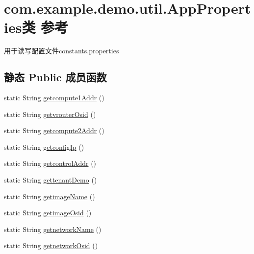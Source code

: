 \hypertarget{classcom_1_1example_1_1demo_1_1util_1_1_app_properties}{}\section{com.\+example.\+demo.\+util.\+App\+Properties类 参考}
\label{classcom_1_1example_1_1demo_1_1util_1_1_app_properties}


用于读写配置文件constants.\+properties  


\subsection*{静态 Public 成员函数}
\begin{DoxyCompactItemize}
\item 
static String \mbox{\hyperlink{classcom_1_1example_1_1demo_1_1util_1_1_app_properties_a12bbcd5410e39d3cd62c75c8e8456e39}{getcompute1\+Addr}} ()
\item 
static String \mbox{\hyperlink{classcom_1_1example_1_1demo_1_1util_1_1_app_properties_ac46bd1bc264acb28076085bb32b6851c}{getvrouter\+Osid}} ()
\item 
static String \mbox{\hyperlink{classcom_1_1example_1_1demo_1_1util_1_1_app_properties_a445445739361ab4233d4e987f6f418a1}{getcompute2\+Addr}} ()
\item 
static String \mbox{\hyperlink{classcom_1_1example_1_1demo_1_1util_1_1_app_properties_af6557d0f4c0437a91c7bad99c668df38}{getconfig\+Ip}} ()
\item 
static String \mbox{\hyperlink{classcom_1_1example_1_1demo_1_1util_1_1_app_properties_a5acc409859142bc09912b220a4a181e8}{getcontrol\+Addr}} ()
\item 
static String \mbox{\hyperlink{classcom_1_1example_1_1demo_1_1util_1_1_app_properties_ae6aff9c10a0cb9a5bd726914209064a2}{gettenant\+Demo}} ()
\item 
static String \mbox{\hyperlink{classcom_1_1example_1_1demo_1_1util_1_1_app_properties_adbeb9e11e3e9fb67be02f39b50218f85}{getimage\+Name}} ()
\item 
static String \mbox{\hyperlink{classcom_1_1example_1_1demo_1_1util_1_1_app_properties_a6ee72dc75d75ab30c450412ec7db5cfc}{getimage\+Osid}} ()
\item 
static String \mbox{\hyperlink{classcom_1_1example_1_1demo_1_1util_1_1_app_properties_ad5758c60dd0970fbe02a34809ebd12eb}{getnetwork\+Name}} ()
\item 
static String \mbox{\hyperlink{classcom_1_1example_1_1demo_1_1util_1_1_app_properties_a43f99bfc7bbbef8d360bcedd7da6372f}{getnetwork\+Osid}} ()

\end{DoxyCompactItemize}
